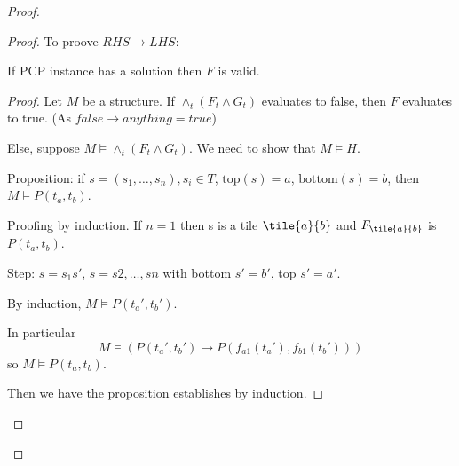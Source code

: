 \begin{proof}
\begin{proof}
To proove $RHS \rightarrow LHS$:

\begin{lemma}
If PCP instance has a solution then $F$ is valid.
\end{lemma}

\begin{proof}

Let $M$ be a structure. If \(\land_t(F_t\land G_t)\) evaluates to false, then $F$ evaluates to true. (As $false \rightarrow anything = true$)

Else, suppose $M \models \land_t(F_t\land G_t)$. We need to show that $M \models H$.

Proposition: if \(s = (s_1,\dots,s_n), s_i \in T\), \(\text{top}(s)=a\),
\(\text{bottom}(s)=b\), then \(M \models P(t_a,t_b)\).

Proofing by induction. If \(n=1\) then s is a tile \(\tile{a}{b}\) and
\(F_{\tile{a}{b}}\) is \(P(t_a,t_b)\).

Step: \(s=s_1s'\), \(s = s2,\dots,sn\) with bottom \(s' = b'\), top \(s' =
a'\).

By induction, $M \models P(t_a',t_b')$.

In particular $$M \models (P(t_a',t_b') \rightarrow
P(f_{a1}(t_a'),f_{b1}(t_b')))$$ so $M \models P(t_a,t_b)$.

Then we have the proposition establishes by induction.

\end{proof}
\end{proof}

\end{proof}
